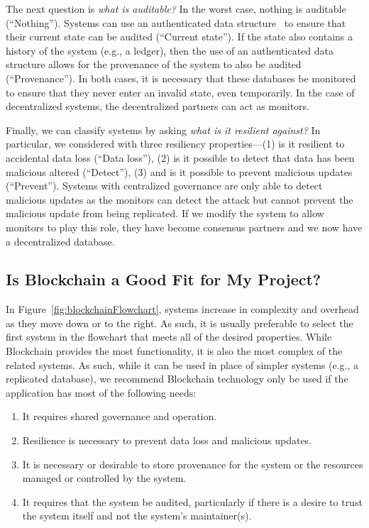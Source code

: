 The next question is \emph{what is auditable?}
In the worst case, nothing is auditable (``Nothing'').
Systems can use an authenticated data structure~\cite{tamassia2003authenticated} to ensure that their current state can be audited (``Current state'').
If the state also contains a history of the system (e.g., a ledger), then the use of an authenticated data structure allows for the provenance of the system to also be audited (``Provenance'').
In both cases, it is necessary that these databases be monitored to ensure that they never enter an invalid state, even temporarily.
In the case of decentralized systems, the decentralized partners can act as monitors.

Finally, we can classify systems by asking \emph{what is it resilient against?}
In particular, we considered with three resiliency properties---(1) is it resilient to accidental data loss (``Data loss''), (2) is it possible to detect that data has been malicious altered (``Detect''), (3) and is it possible to prevent malicious updates (``Prevent'').
Systems with centralized governance are only able to detect malicious updates as the monitors can detect the attack but cannot prevent the malicious update from being replicated.
If we modify the system to allow monitors to play this role, they have become consensus partners and we now have a decentralized database.

\subsection{Is Blockchain a Good Fit for My Project?}
\label{sec:should-i-use-it}
In Figure~\ref{fig:blockchainFlowchart}, systems increase in complexity and overhead as they move down or to the right.
As such, it is usually preferable to select the first system in the flowchart that meets all of the desired properties.
While Blockchain provides the most functionality, it is also the most complex of the related systems.
As such, while it can be used in place of simpler systems (e.g., a replicated database), we recommend Blockchain technology only be used if the application has most of the following needs:

\begin{enumerate}
	\item It requires shared governance and operation.
	\item Resilience is necessary to prevent data loss and malicious updates.
	\item It is necessary or desirable to store provenance for the system or the resources managed or controlled by the system.
	\item It requires that the system be audited, particularly if there is a desire to trust the system itself and not the system's maintainer(s).
\end{enumerate}

